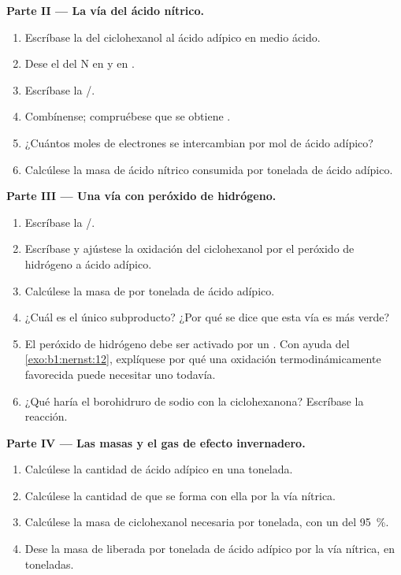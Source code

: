 \begin{problem}
\medskip
\noindent\textbf{Parte II --- La vía del ácido nítrico.}
\begin{enumerate}[resume]
  \item Escríbase la  del ciclohexanol al ácido adípico en
        medio ácido.
  \item Dese el  del N en  y en .
  \item Escríbase la  /.
  \item Combínense; compruébese que se obtiene
        .
  \item ¿Cuántos moles de electrones se intercambian por mol de ácido
        adípico?
  \item Calcúlese la masa de ácido nítrico consumida por tonelada de ácido
        adípico.
\end{enumerate}

\medskip
\noindent\textbf{Parte III --- Una vía con peróxido de hidrógeno.}
\begin{enumerate}[resume]
  \item Escríbase la  /.
  \item Escríbase y ajústese la oxidación del ciclohexanol por el peróxido
        de hidrógeno a ácido adípico.
  \item Calcúlese la masa de  por tonelada de ácido adípico.
  \item ¿Cuál es el único subproducto? ¿Por qué se dice que esta vía es
        más verde?
  \item El peróxido de hidrógeno debe ser activado por un .
        Con ayuda del \cref{exo:b1:nernst:12}, explíquese por qué una
        oxidación termodinámicamente favorecida puede necesitar uno
        todavía.
  \item ¿Qué haría el borohidruro de sodio con la ciclohexanona?
        Escríbase la reacción.
\end{enumerate}

\medskip
\noindent\textbf{Parte IV --- Las masas y el gas de efecto invernadero.}
\begin{enumerate}[resume]
  \item Calcúlese la cantidad de ácido adípico en una tonelada.
  \item Calcúlese la cantidad de  que se forma con ella por la vía
        nítrica.
  \item Calcúlese la masa de ciclohexanol necesaria por tonelada, con un
         del \qty{95}{\percent}.
  \item Dese la masa de  liberada por tonelada de ácido adípico
        por la vía nítrica, en toneladas.
\end{enumerate}
\end{problem}
